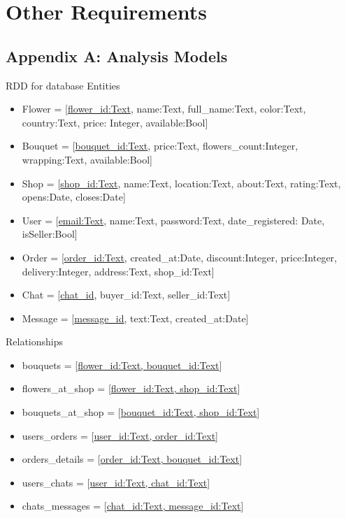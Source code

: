 \documentclass{scrreprt}
\begin{document}
\chapter{Other Requirements}

\section{Appendix A: Analysis Models}
\begin{figure}[h]
\end{figure}

RDD for database
Entities
\begin{itemize}
\item Flower = {[\underline{flower_id:Text}, name:Text, full_name:Text, color:Text, country:Text, price: Integer, available:Bool]}
\item Bouquet = {[\underline{bouquet_id:Text}, price:Text, flowers_count:Integer, wrapping:Text, available:Bool]}
\item Shop = {[\underline{shop_id:Text}, name:Text, location:Text, about:Text, rating:Text, opens:Date, closes:Date]} 
\item User = {[\underline{email:Text}, name:Text, password:Text, date_registered: Date, isSeller:Bool]}
\item Order = {[\underline{order_id:Text}, created_at:Date, discount:Integer, price:Integer, delivery:Integer, address:Text, shop_id:Text]}
\item Chat = {[\underline{chat_id}, buyer_id:Text, seller_id:Text]}
\item Message = {[\underline{message_id}, text:Text, created_at:Date]}
\end{itemize}

Relationships
\begin{itemize}

\item bouquets = {[\underline{flower_id:Text, bouquet_id:Text}]}

\item flowers_at_shop = {[\underline{flower_id:Text, shop_id:Text}]}

\item bouquets_at_shop = {[\underline{bouquet_id:Text, shop_id:Text}]}

\item users_orders = {[\underline{user_id:Text, order_id:Text}]}

\item orders_details = {[\underline{order_id:Text, bouquet_id:Text}]}

\item users_chats = {[\underline{user_id:Text, chat_id:Text}]}

\item chats_messages = {[\underline{chat_id:Text, message_id:Text}]}

\end{itemize}
\end{document}
